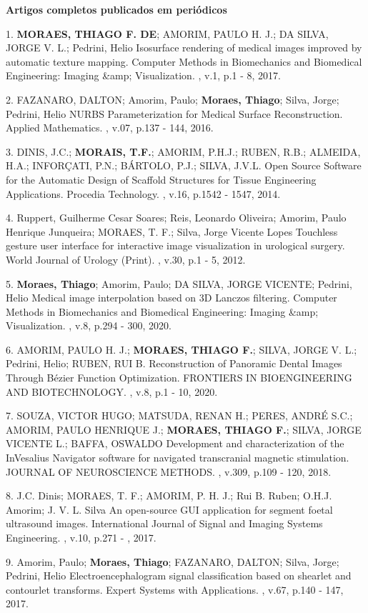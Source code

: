 \textbf{Artigos completos publicados em periódicos}

1. \textbf{MORAES, THIAGO F. DE}; AMORIM, PAULO H. J.; DA SILVA, JORGE
V. L.; Pedrini, Helio
Isosurface rendering of medical images improved by automatic texture
mapping. Computer Methods in Biomechanics and Biomedical Engineering:
Imaging \&amp; Visualization. , v.1, p.1 - 8, 2017.

2. FAZANARO, DALTON; Amorim, Paulo; \textbf{Moraes, Thiago}; Silva,
Jorge; Pedrini, Helio
NURBS Parameterization for Medical Surface Reconstruction. Applied
Mathematics. , v.07, p.137 - 144, 2016.

3. DINIS, J.C.; \textbf{MORAIS, T.F.}; AMORIM, P.H.J.; RUBEN, R.B.;
ALMEIDA, H.A.; INFORÇATI, P.N.; BÁRTOLO, P.J.; SILVA, J.V.L.
Open Source Software for the Automatic Design of Scaffold Structures for
Tissue Engineering Applications. Procedia Technology. , v.16, p.1542 -
1547, 2014.

4. Ruppert, Guilherme Cesar Soares; Reis, Leonardo Oliveira; Amorim,
Paulo Henrique Junqueira; MORAES, T. F.; Silva, Jorge Vicente Lopes
Touchless gesture user interface for interactive image visualization in
urological surgery. World Journal of Urology (Print). , v.30, p.1 - 5,
2012.

5. \textbf{Moraes, Thiago}; Amorim, Paulo; DA SILVA, JORGE VICENTE;
Pedrini, Helio
Medical image interpolation based on 3D Lanczos filtering. Computer
Methods in Biomechanics and Biomedical Engineering: Imaging \&amp;
Visualization. , v.8, p.294 - 300, 2020.

6. AMORIM, PAULO H. J.; \textbf{MORAES, THIAGO F.}; SILVA, JORGE V. L.;
Pedrini, Helio; RUBEN, RUI B.
Reconstruction of Panoramic Dental Images Through Bézier Function
Optimization. FRONTIERS IN BIOENGINEERING AND BIOTECHNOLOGY. , v.8, p.1
- 10, 2020.

7. SOUZA, VICTOR HUGO; MATSUDA, RENAN H.; PERES, ANDRÉ S.C.; AMORIM,
PAULO HENRIQUE J.; \textbf{MORAES, THIAGO F.}; SILVA, JORGE VICENTE L.;
BAFFA, OSWALDO
Development and characterization of the InVesalius Navigator software
for navigated transcranial magnetic stimulation. JOURNAL OF NEUROSCIENCE
METHODS. , v.309, p.109 - 120, 2018.

8. J.C. Dinis; MORAES, T. F.; AMORIM, P. H. J.; Rui B. Ruben; O.H.J.
Amorim; J. V. L. Silva
An open-source GUI application for segment foetal ultrasound images.
International Journal of Signal and Imaging Systems Engineering. , v.10,
p.271 - , 2017.

9. Amorim, Paulo; \textbf{Moraes, Thiago}; FAZANARO, DALTON; Silva,
Jorge; Pedrini, Helio
Electroencephalogram signal classification based on shearlet and
contourlet transforms. Expert Systems with Applications. , v.67, p.140 -
147, 2017.

